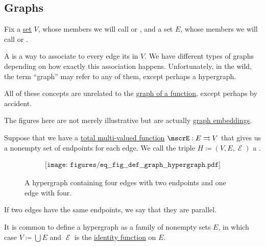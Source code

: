 \subsection{Graphs}\label{subsec:graphs}

\begin{definition}\label{def:graph}
  Fix a \hyperref[def:set]{set} \( V \), whose members we will call  or , and a set \( E \), whose members we will call  or .

  A  is a way to associate to every edge its  in \( V \). We have different types of graphs depending on how exactly this association happens. Unfortunately, in the wild, the term \enquote{graph} may refer to any of them, except perhaps a hypergraph.

  All of these concepts are unrelated to the \hyperref[def:multi_valued_function/graph]{graph of a function}, except perhaps by accident.

  The figures here are not merely illustrative but are actually \hyperref[def:quiver_geometric_realization/embedding]{graph embeddings}.

  \begin{thmenum}[series=def:graph]
     Suppose that we have a \hyperref[def:multi_valued_function/total]{total multi-valued function} \( \mscrE: E \multto V \) that gives us a nonempty set of endpoints for each edge. We call the triple \( H \coloneqq (V, E, \mscrE) \) a .

    \begin{figure}[h]
      \begin{equation}\label{eq:fig:def:graph/hypergraph}
        \begin{aligned}
          \texttt{[image: figures/eq\_\_fig\_\_def\_\_graph\_\_hypergraph.pdf]}
        \end{aligned}
      \end{equation}
      \caption{A hypergraph containing four edges with two endpoints and one edge with four.}\label{fig:def:graph/hypergraph}
    \end{figure}

    If two edges have the same endpoints, we say that they are parallel.

    It is common to define a hypergraph as a family of nonempty sets \( E \), in which case \( V \coloneqq \bigcup E \) and \( \mscrE \) is the \hyperref[def:multi_valued_function/identity]{identity function} on \( E \).


\end{thmenum}
\end{definition}
